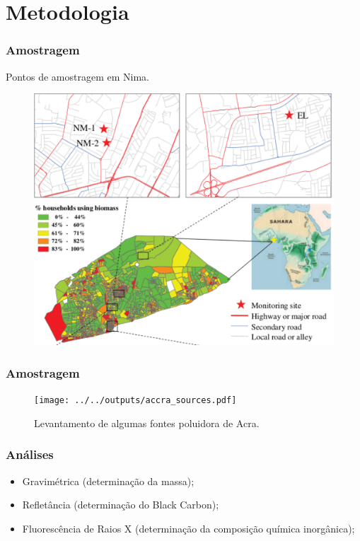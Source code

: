 \section{Metodologia}

\begin{frame}
  \frametitle{Amostragem}
  Pontos de amostragem em Nima.
  \begin{figure}[H]
    \centering
    \includegraphics[scale=0.35]{../../inputs/images/zheng/nima_mapa.pdf}
  \end{figure}
\end{frame}

\begin{frame}
  \frametitle{Amostragem}
  \begin{figure}[H]
  \centering	
  \texttt{[image: ../../outputs/accra\_sources.pdf]}
  \caption{Levantamento de algumas fontes poluidora de Acra.
           \label{fg:acrasources}}
 \end{figure}
\end{frame}

\begin{frame}
  \frametitle{Análises}
  \begin{itemize}
    \item Gravimétrica (determinação da massa);  
    \item Refletância (determinação do Black Carbon);
    \item Fluorescência de Raios X (determinação da composição química inorgânica);
  \end{itemize}
\end{frame}

